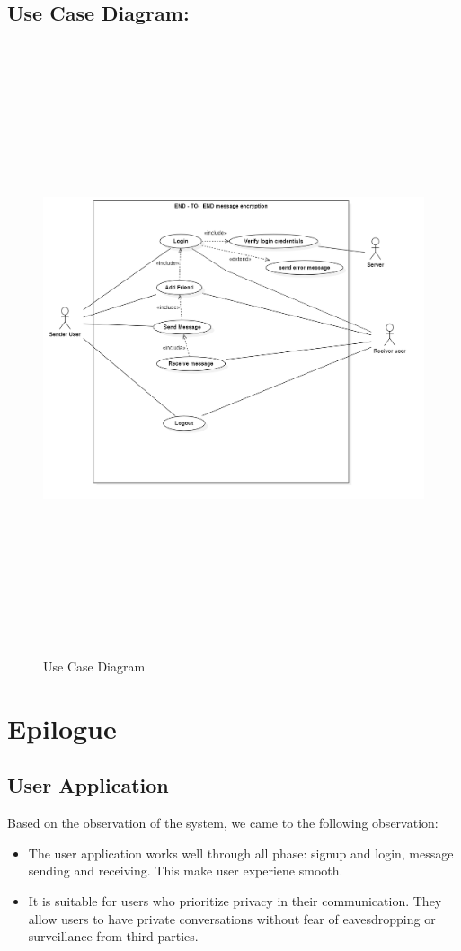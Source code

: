 \section{Use Case Diagram:}
\begin{figure}[H]
	\centering
	\includegraphics[width=180mm, height=180mm]{images/UseCaseDiagram1.png}
	\caption{Use Case Diagram} %
	\label{figusecase} %
\end{figure}




\chapter{Epilogue}

\section{User Application}
Based on the observation of the system, we came to the following observation:
\vspace{-18pt}
\begin{itemize}
	\item The user application works well through all phase: signup and login, message sending and receiving. This make user experiene smooth.
	\item It is suitable for users who prioritize privacy in their communication. They allow users to have private conversations without fear of eavesdropping or surveillance from third parties.
\end{itemize}

